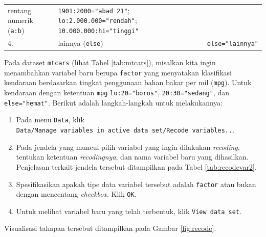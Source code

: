 \documentclass[12pt,]{krantz}
\providecommand{\tightlist}{%
  \setlength{\itemsep}{0pt}\setlength{\parskip}{0pt}}
\begin{document}
\begin{longtable}[]{@{}lll@{}}
\begin{minipage}[t]{0.23\columnwidth}
rentang numerik (\texttt{a:b})\strut
\end{minipage} & \begin{minipage}[t]{0.62\columnwidth}\raggedright
\texttt{1901:2000="abad\ 21"}; \texttt{lo:2.000.000="rendah"}; \texttt{10.000.000:hi="tinggi"}\strut
\end{minipage}\tabularnewline
\begin{minipage}[t]{0.06\columnwidth}\raggedright
4.\strut
\end{minipage} & \begin{minipage}[t]{0.23\columnwidth}\raggedright
lainnya (\texttt{else})\strut
\end{minipage} & \begin{minipage}[t]{0.62\columnwidth}\raggedright
\texttt{else="lainnya"}\strut
\end{minipage}\tabularnewline
\bottomrule
\end{longtable}

Pada dataset \texttt{mtcars} (lihat Tabel \ref{tab:mtcars}), misalkan kita ingin menambahkan variabel baru berupa \texttt{factor} yang menyatakan klasifikasi kendaraan berdasarkan tingkat penggunaan bahan bakar per mil (\texttt{mpg}). Untuk kendaraan dengan ketentuan \texttt{mpg} \texttt{lo:20="boros"}, \texttt{20:30="sedang"}, dan \texttt{else="hemat"}. Berikut adalah langkah-langkah untuk melakukannya:

\begin{enumerate}
\def\labelenumi{\arabic{enumi}.}
\tightlist
\item
  Pada menu \texttt{Data}, klik \texttt{Data/Manage\ variables\ in\ active\ data\ set/Recode\ variables..}.
\item
  Pada jendela yang muncul pilih variabel yang ingin dilakukan \emph{recoding}, tentukan ketentuan \emph{recodingnya}, dan nama variabel baru yang dihasilkan. Penjelasan terkait jendela tersebut ditampilkan pada Tabel \ref{tab:recodevar2}.
\item
  Spesifikasikan apakah tipe data variabel tersebut adalah \texttt{factor} atau bukan dengan mencentang \emph{checkbox}. Klik \texttt{OK}.
\item
  Untuk melihat variabel baru yang telah terbentuk, klik \texttt{View\ data\ set}.
\end{enumerate}

Visualisasi tahapan tersebut ditampilkan pada Gambar \ref{fig:recode}.
\end{document}
